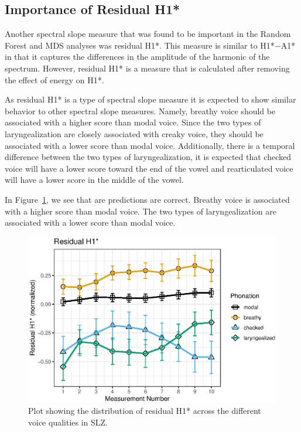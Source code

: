 \subsection{Importance of Residual H1*} \label{sec:rh1_discussion}

Another spectral slope measure that was found to be important in the Random Forest and MDS analyses was residual H1*. This measure is similar to H1*$-$A1* in that it captures the differences in the amplitude of the harmonic of the spectrum. However, residual H1* is a measure that is calculated after removing the effect of energy on H1*. 

As residual H1* is a type of spectral slope measure it is expected to show similar behavior to other spectral slope measures. Namely, breathy voice should be associated with a higher score than modal voice. Since the two types of laryngealization are closely associated with creaky voice, they should be associated with a lower score than modal voice. Additionally, there is a temporal difference between the two types of laryngealization, it is expected that checked voice will have a lower score toward the end of the vowel and  rearticulated voice will have a lower score in the middle of the vowel. 

In Figure~\ref{fig:residualH1}, we see that are predictions are correct. Breathy voice is associated with a higher score than modal voice. The two types of laryngealization are associated with a lower score than modal voice.

\begin{figure}[h!]
    \centering
    \includegraphics[width = 0.9\linewidth]{images/slz_residual_h1c.eps}
    \caption{Plot showing the distribution of residual H1* across the different voice qualities in SLZ.}
    \label{fig:residualH1}
\end{figure}


